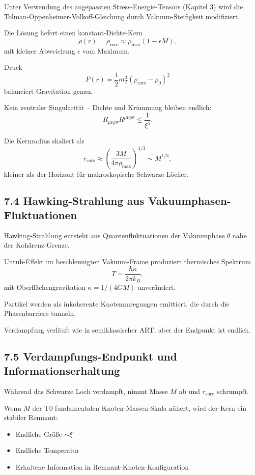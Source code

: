 	Unter Verwendung des angepassten Stress-Energie-Tensors (Kapitel 3) wird die Tolman-Oppenheimer-Volkoff-Gleichung durch Vakuum-Steifigkeit modifiziert.
	
	Die Lösung liefert einen konstant-Dichte-Kern
	\[
	\rho(r) = \rho_{\text{core}} \approx \rho_{\text{max}} (1 - \epsilon M),
	\]
	mit kleiner Abweichung $\epsilon$ vom Maximum.
	
	Druck
	\[
	P(r) = \frac{1}{2} m_T^2 (\rho_{\text{core}} - \rho_0)^2
	\]
	balanciert Gravitation genau.
	
	Kein zentraler Singularität – Dichte und Krümmung bleiben endlich:
	\[
	R_{\mu\nu\rho\sigma} R^{\mu\nu\rho\sigma} \leq \frac{1}{\xi^4}.
	\]
	
	Die Kernradius skaliert als
	\[
	r_{\text{core}} \approx \left(\frac{3M}{4\pi \rho_{\text{max}}}\right)^{1/3} \sim M^{1/3},
	\]
	kleiner als der Horizont für makroskopische Schwarze Löcher.
	
	\subsection{7.4 Hawking-Strahlung aus Vakuumphasen-Fluktuationen}
	
	Hawking-Strahlung entsteht aus Quantenfluktuationen der Vakuumphase $\theta$ nahe der Kohärenz-Grenze.
	
	Unruh-Effekt im beschleunigten Vakuum-Frame produziert thermisches Spektrum
	\[
	T = \frac{\hbar \kappa}{2\pi k_B},
	\]
	mit Oberflächengravitation $\kappa = 1/(4GM)$ unverändert.
	
	Partikel werden als inkoherente Knotenanregungen emittiert, die durch die Phasenbarriere tunneln.
	
	Verdampfung verläuft wie in semiklassischer ART, aber der Endpunkt ist endlich.
	
	\subsection{7.5 Verdampfungs-Endpunkt und Informationserhaltung}
	
	Während das Schwarze Loch verdampft, nimmt Masse $M$ ab und $r_{\text{core}}$ schrumpft.
	
	Wenn $M$ der T0 fundamentalen Knoten-Massen-Skala nähert, wird der Kern ein stabiler Remnant:
	\begin{itemize}
		\item Endliche Größe $\sim \xi$
		\item Endliche Temperatur
		\item Erhaltene Information in Remnant-Knoten-Konfiguration
	\end{itemize}
	

